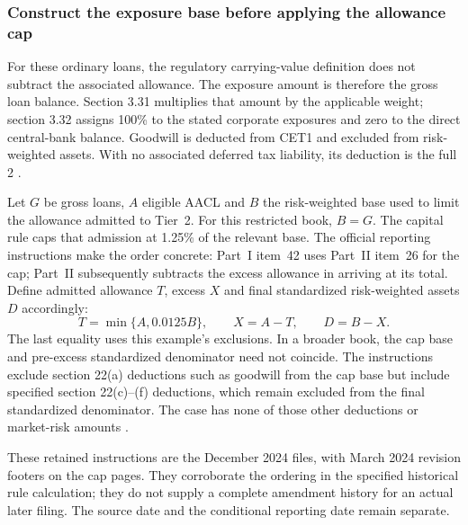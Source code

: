\subsubsection*{Construct the exposure base before applying the allowance cap}

For these ordinary loans, the regulatory carrying-value definition does not
subtract the associated allowance. The exposure amount is therefore the
gross loan balance. Section 3.31 multiplies that amount by the applicable
weight; section 3.32 assigns 100\% to the stated corporate exposures and
zero to the direct central-bank balance. Goodwill is deducted from CET1
and excluded from risk-weighted assets. With no associated deferred tax
liability, its deduction is the full 2
\citep[12~CFR~3.31(a)--(b)]{occrwamechanics2026}
\citep[12~CFR~3.32(a)(1)(i)(A), (f)(1), (k)]{occriskweights2026}
\citep[12~CFR~3.22(a)(1), (e), (g)]{occcapitaldeductions2026}.

Let \(G\) be gross loans, \(A\) eligible AACL and \(B\) the risk-weighted
base used to limit the allowance admitted to Tier~2. For this restricted
book, \(B=G\). The capital rule caps that admission at 1.25\% of the
relevant base. The official reporting instructions make the order concrete:
Part~I item~42 uses Part~II item~26 for the cap; Part~II subsequently
subtracts the excess allowance in arriving at its total. Define admitted
allowance \(T\), excess \(X\) and final standardized risk-weighted assets
\(D\) accordingly:
\[
 T=\min\{A,0.0125B\},\qquad X=A-T,\qquad D=B-X.
\]
The last equality uses this example's exclusions. In a broader book, the
cap base and pre-excess standardized denominator need not coincide. The
instructions exclude section 22(a) deductions such as goodwill from the
cap base but include specified section 22(c)--(f) deductions, which remain
excluded from the final standardized denominator. The case has none of
those other deductions or market-risk amounts
\citep[12~CFR~3.20(d)(3)]{occcapitaleligibility2026}
\citep[Part~I, item~42, pp.~RC-R-27--28; Part~II, items~26 and 28--31,
pp.~RC-R-109--110]{ffiec051capital2024,ffiec051rwa2024}.

These retained instructions are the December 2024 files, with March 2024
revision footers on the cap pages. They corroborate the ordering in the
specified historical rule calculation; they do not supply a complete
amendment history for an actual later filing. The source date and the
conditional reporting date remain separate.

